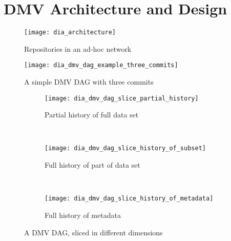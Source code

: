 \documentclass[usenglish]{nik}
\begin{document}
\section{DMV Architecture and Design}


\begin{figure}[]
    \centering
    \texttt{[image: dia\_architecture]}
    \caption{Repositories in an ad-hoc network}
    \label{fig:dia_architecture}
\end{figure}

\begin{figure}[]
    \centering
    \texttt{[image: dia\_dmv\_dag\_example\_three\_commits]}
    \caption{A simple DMV DAG with three commits}
    \label{dia_dmv_dag_example_three_commits}
\end{figure}


\newcommand{\slicediagramwidth}{0.45\textwidth}

\begin{figure}[]

    \centering

    \begin{subfigure}[]{\slicediagramwidth}
        \texttt{[image: dia\_dmv\_dag\_slice\_partial\_history]}
        \caption{Partial history of full data set}
        \label{dia_dmv_dag_slice_partial_history}
    \end{subfigure}
    ~
    \begin{subfigure}[]{\slicediagramwidth}
        \texttt{[image: dia\_dmv\_dag\_slice\_history\_of\_subset]}
        \caption{Full history of part of data set}
        \label{dia_dmv_dag_slice_history_of_subset}
    \end{subfigure}
    ~
    \begin{subfigure}[]{\slicediagramwidth}
        \texttt{[image: dia\_dmv\_dag\_slice\_history\_of\_metadata]}
        \caption{Full history of metadata}
        \label{dia_dmv_dag_slice_history_of_metadata}
    \end{subfigure}

    \caption{A DMV DAG, sliced in different dimensions}
\end{figure}
\end{document}
